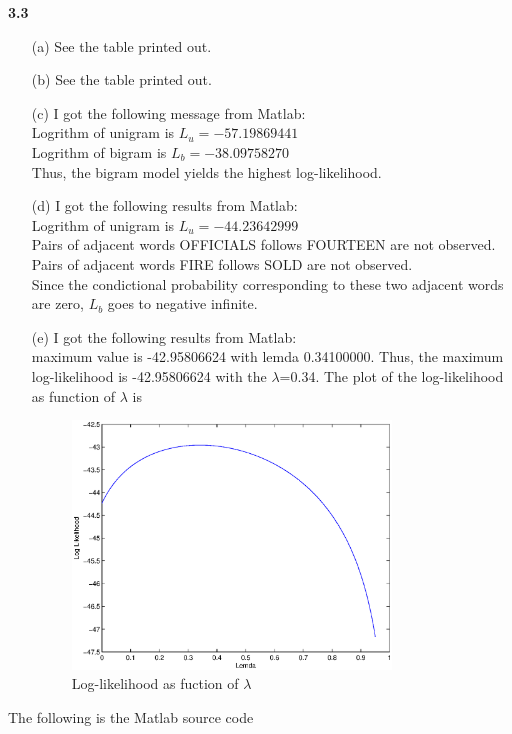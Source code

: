\documentclass[12pt]{article} %
\theoremstyle{definition}\newtheorem{law}{Law}
\theoremstyle{plain}\newtheorem{jury}[law]{Jury}
\theoremstyle{remark}\newtheorem{juu}{Juu}
\theoremstyle{definition}\newtheorem{kuu}[law]{Kuu}
\theoremstyle{definition}\newtheorem{muu}{Muu}[section]
\theoremstyle{definition}\newtheorem{honoluu}{Honoluu}[section]
\theoremstyle{definition}\newtheorem{konoluu}[muu]{Konoluu}
\begin{document}
\textbf{3.3}
\begin{enumerate}
\item[(a)]
See the table printed out.


\item[(b)]
See the table printed out.


\item[(c)]
I got the following message from Matlab:\\
Logrithm of unigram is $L_u= -57.19869441$\\
Logrithm of bigram is $L_b= -38.09758270$\\
Thus, the bigram model yields the highest log-likelihood.

\item[(d)] I got the following results from Matlab:\\
Logrithm of unigram is $L_u = -44.23642999$\\
Pairs of adjacent words OFFICIALS follows FOURTEEN are not observed. Pairs of adjacent words FIRE follows SOLD are not observed. \\
Since the condictional probability corresponding to these two adjacent words are zero, $L_b$ goes to negative infinite.

\item[(e)] I got the following results from Matlab:\\
maximum value is -42.95806624 with lemda 0.34100000. Thus, the maximum log-likelihood is -42.95806624 with the $\lambda$=0.34. The plot of the log-likelihood as function of $\lambda$ is
\begin{figure}[htbp]
\centering
\includegraphics[width=0.8\textwidth]{cse_hw3_e.eps}
\caption{Log-likelihood as fuction of $\lambda$}
\label{LLH1}
\end{figure}
\end{enumerate}
The following is the Matlab source code\\
\\


\end{document}
